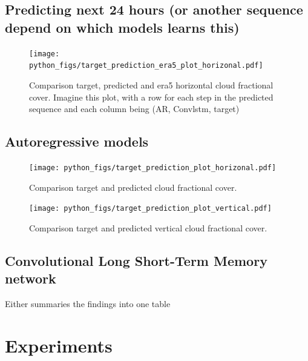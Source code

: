 \subsection{Predicting next 24 hours (or another sequence depend on which models learns this)}
\begin{figure}[ht]
    \centering
    \texttt{[image: python\_figs/target\_prediction\_era5\_plot\_horizonal.pdf]}
    \caption{Comparison target, predicted and era5 horizontal cloud fractional cover. Imagine this plot, with a row for each step in the predicted sequence and each column being (AR, Convlstm, target)}
    \label{fig:target_predict_era5_horizontal}
\end{figure}



\subsection{Autoregressive models}

\begin{figure}[ht]
    \centering
    \texttt{[image: python\_figs/target\_prediction\_plot\_horizonal.pdf]}
    \caption{Comparison target and predicted cloud fractional cover.}
    \label{fig:target_predict_horizontal}
\end{figure}

\begin{figure}[ht]
    \centering
    \texttt{[image: python\_figs/target\_prediction\_plot\_vertical.pdf]}
    \caption{Comparison target and predicted vertical cloud fractional cover.}
    \label{fig:target_predict_vertical}
\end{figure}



\subsection{Convolutional Long Short-Term Memory network}
Either summaries the findings into one table 


\section{Experiments}





